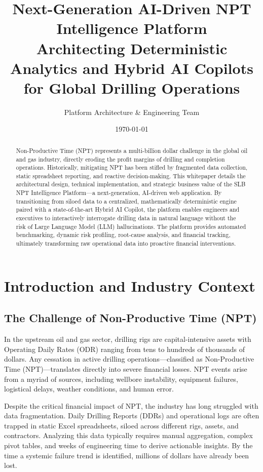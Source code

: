 \documentclass[11pt,a4paper]{article}
\title{\Huge \textbf{Next-Generation AI-Driven NPT Intelligence Platform} \\ \vspace{0.5cm} \Large \textbf{Architecting Deterministic Analytics and Hybrid AI Copilots for Global Drilling Operations}}
\author{\Large Platform Architecture \& Engineering Team}
\date{\today}
\begin{document}
\maketitle
\thispagestyle{empty}

\begin{abstract}
\noindent Non-Productive Time (NPT) represents a multi-billion dollar challenge in the global oil and gas industry, directly eroding the profit margins of drilling and completion operations. Historically, mitigating NPT has been stifled by fragmented data collection, static spreadsheet reporting, and reactive decision-making. This whitepaper details the architectural design, technical implementation, and strategic business value of the SLB NPT Intelligence Platform—a next-generation, AI-driven web application. By transitioning from siloed data to a centralized, mathematically deterministic engine paired with a state-of-the-art Hybrid AI Copilot, the platform enables engineers and executives to interactively interrogate drilling data in natural language without the risk of Large Language Model (LLM) hallucinations. The platform provides automated benchmarking, dynamic risk profiling, root-cause analysis, and financial tracking, ultimately transforming raw operational data into proactive financial interventions.
\end{abstract}

\newpage
\tableofcontents
\newpage

\section{Introduction and Industry Context}
\subsection{The Challenge of Non-Productive Time (NPT)}
In the upstream oil and gas sector, drilling rigs are capital-intensive assets with Operating Daily Rates (ODR) ranging from tens to hundreds of thousands of dollars. Any cessation in active drilling operations—classified as Non-Productive Time (NPT)—translates directly into severe financial losses. NPT events arise from a myriad of sources, including wellbore instability, equipment failures, logistical delays, weather conditions, and human error.

Despite the critical financial impact of NPT, the industry has long struggled with data fragmentation. Daily Drilling Reports (DDRs) and operational logs are often trapped in static Excel spreadsheets, siloed across different rigs, assets, and contractors. Analyzing this data typically requires manual aggregation, complex pivot tables, and weeks of engineering time to derive actionable insights. By the time a systemic failure trend is identified, millions of dollars have already been lost.
\end{document}

